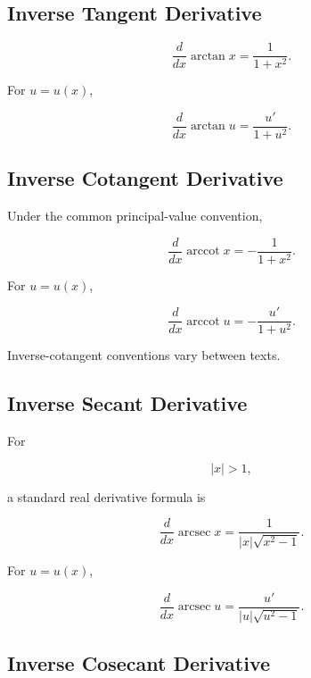 \subsection{Inverse Tangent Derivative}
\label{subsec:inverse-tangent-derivative}

\[
\boxed{
\frac{d}{dx}\arctan x
=
\frac{1}{1+x^2}.
}
\]

For \(u=u(x)\),

\[
\boxed{
\frac{d}{dx}\arctan u
=
\frac{
u'
}{
1+u^2
}.
}
\]

\subsection{Inverse Cotangent Derivative}
\label{subsec:inverse-cotangent-derivative}

Under the common principal-value convention,

\[
\boxed{
\frac{d}{dx}\operatorname{arccot}x
=
-\frac{1}{1+x^2}.
}
\]

For \(u=u(x)\),

\[
\boxed{
\frac{d}{dx}\operatorname{arccot}u
=
-\frac{
u'
}{
1+u^2
}.
}
\]

Inverse-cotangent conventions vary between texts.

\subsection{Inverse Secant Derivative}
\label{subsec:inverse-secant-derivative}

For

\[
|x|>1,
\]

a standard real derivative formula is

\[
\boxed{
\frac{d}{dx}\operatorname{arcsec}x
=
\frac{
1
}{
|x|\sqrt{x^2-1}
}.
}
\]

For \(u=u(x)\),

\[
\boxed{
\frac{d}{dx}\operatorname{arcsec}u
=
\frac{
u'
}{
|u|\sqrt{u^2-1}
}.
}
\]

\subsection{Inverse Cosecant Derivative}
\label{subsec:inverse-cosecant-derivative}

